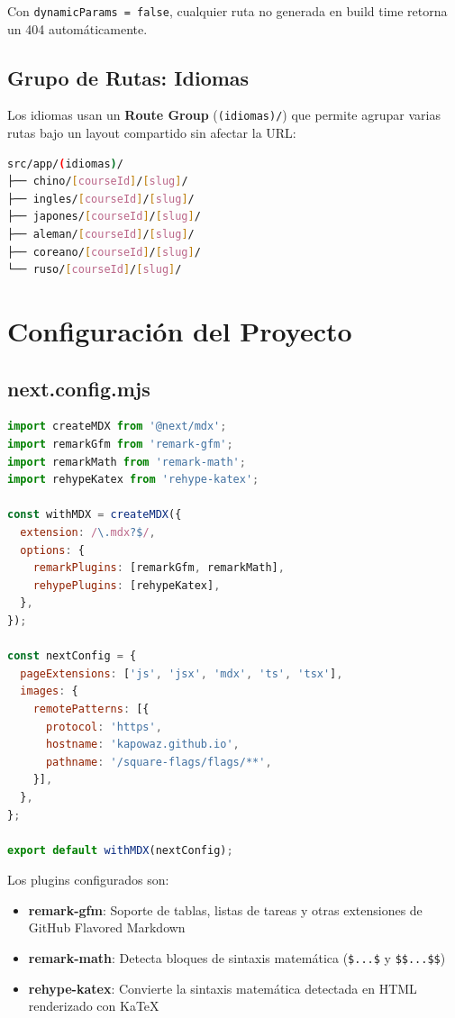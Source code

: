 \documentclass[12pt,a4paper]{article}
\begin{document}
Con \texttt{dynamicParams = false}, cualquier ruta no generada en build time retorna un 404 automáticamente.

\subsection{Grupo de Rutas: Idiomas}

Los idiomas usan un \textbf{Route Group} (\texttt{(idiomas)/}) que permite agrupar varias rutas bajo un layout compartido sin afectar la URL:

\begin{lstlisting}[language=bash]
src/app/(idiomas)/
├── chino/[courseId]/[slug]/
├── ingles/[courseId]/[slug]/
├── japones/[courseId]/[slug]/
├── aleman/[courseId]/[slug]/
├── coreano/[courseId]/[slug]/
└── ruso/[courseId]/[slug]/
\end{lstlisting}

\section{Configuración del Proyecto}

\subsection{next.config.mjs}

\begin{lstlisting}[language=JavaScript, caption={next.config.mjs}]
import createMDX from '@next/mdx';
import remarkGfm from 'remark-gfm';
import remarkMath from 'remark-math';
import rehypeKatex from 'rehype-katex';

const withMDX = createMDX({
  extension: /\.mdx?$/,
  options: {
    remarkPlugins: [remarkGfm, remarkMath],
    rehypePlugins: [rehypeKatex],
  },
});

const nextConfig = {
  pageExtensions: ['js', 'jsx', 'mdx', 'ts', 'tsx'],
  images: {
    remotePatterns: [{
      protocol: 'https',
      hostname: 'kapowaz.github.io',
      pathname: '/square-flags/flags/**',
    }],
  },
};

export default withMDX(nextConfig);
\end{lstlisting}

Los plugins configurados son:
\begin{itemize}
  \item \textbf{remark-gfm}: Soporte de tablas, listas de tareas y otras extensiones de GitHub Flavored Markdown
  \item \textbf{remark-math}: Detecta bloques de sintaxis matemática (\texttt{\$...\$} y \texttt{\$\$...\$\$})
  \item \textbf{rehype-katex}: Convierte la sintaxis matemática detectada en HTML renderizado con KaTeX
\end{itemize}
\end{document}
